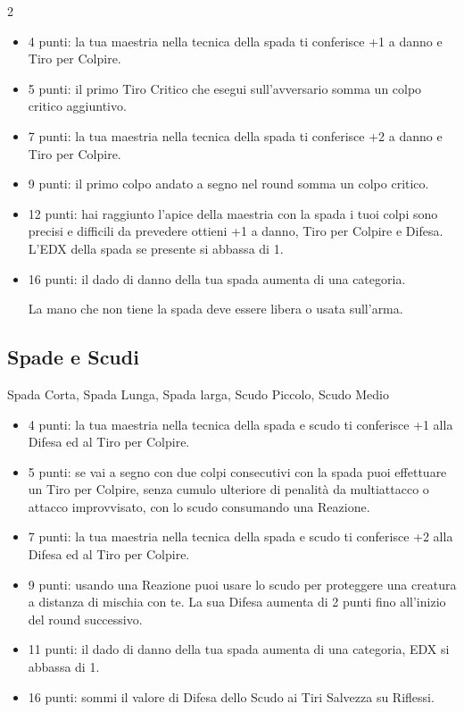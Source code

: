 \begin{multicols}{2}
\begin{itemize}[leftmargin=*]
\item 4 punti: la tua maestria nella tecnica della spada ti conferisce +1 a danno e Tiro per Colpire.
\item 5 punti: il primo Tiro Critico che esegui sull'avversario somma un colpo critico aggiuntivo.
\item 7 punti: la tua maestria nella tecnica della spada ti conferisce +2 a danno e Tiro per Colpire.
\item 9 punti: il primo colpo andato a segno nel round somma un colpo critico.
\item 12 punti: hai raggiunto l'apice della maestria con la spada i tuoi colpi sono precisi e difficili da prevedere ottieni +1 a danno, Tiro per Colpire e Difesa. L'EDX della spada se presente si abbassa di 1.
\item 16 punti: il dado di danno della tua spada aumenta di una categoria.

La mano che non tiene la spada deve essere libera o usata sull'arma.

\end{itemize}

\subsection{Spade e Scudi} Spada Corta, Spada Lunga, Spada larga, Scudo Piccolo, Scudo Medio\label{listaarmispadescudi}

\begin{itemize}[leftmargin=*] \setlength{\itemsep}{0pt}

\item 4 punti: la tua maestria nella tecnica della spada e scudo ti conferisce +1 alla Difesa ed al Tiro per Colpire.
\item 5 punti: se vai a segno con due colpi consecutivi con la spada puoi effettuare un Tiro per Colpire, senza cumulo ulteriore di penalità da multiattacco o attacco improvvisato, con lo scudo consumando una Reazione.
\item 7 punti: la tua maestria nella tecnica della spada e scudo ti conferisce +2 alla Difesa ed al Tiro per Colpire.
\item 9 punti: usando una Reazione puoi usare lo scudo per proteggere una creatura a distanza di mischia con te. La sua Difesa aumenta di 2 punti fino all'inizio del round successivo.
\item 11 punti: il dado di danno della tua spada aumenta di una categoria, EDX si abbassa di 1.
\item 16 punti: sommi il valore di Difesa dello Scudo ai Tiri Salvezza su Riflessi.


\end{itemize}
\end{multicols}
